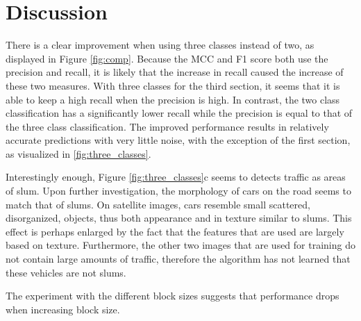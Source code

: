 \section{Discussion}
There is a clear improvement when using three classes instead of two, as displayed in Figure \ref{fig:comp}. Because the MCC and F1 score both use the precision and recall, it is likely that the increase in recall caused the increase of these two measures. With three classes for the third section, it seems that it is able to keep a high recall when the precision is high. In contrast, the two class classification has a significantly lower recall while the precision is equal to that of the three class classification. The improved performance results in relatively accurate predictions with very little noise, with the exception of the first section, as visualized in \ref{fig:three_classes}.

Interestingly enough, Figure \ref{fig:three_classes}c seems to detects traffic as areas of slum. Upon further investigation, the morphology of cars on the road seems to match that of slums. On satellite images, cars resemble small scattered, disorganized, objects, thus both appearance and in texture similar to slums. This effect is perhaps enlarged by the fact that the features that are used are largely based on texture. Furthermore, the other two images that are used for training do not contain large amounts of traffic, therefore the algorithm has not learned that these vehicles are not slums.

The experiment with the different block sizes suggests that performance drops when increasing block size. 





 